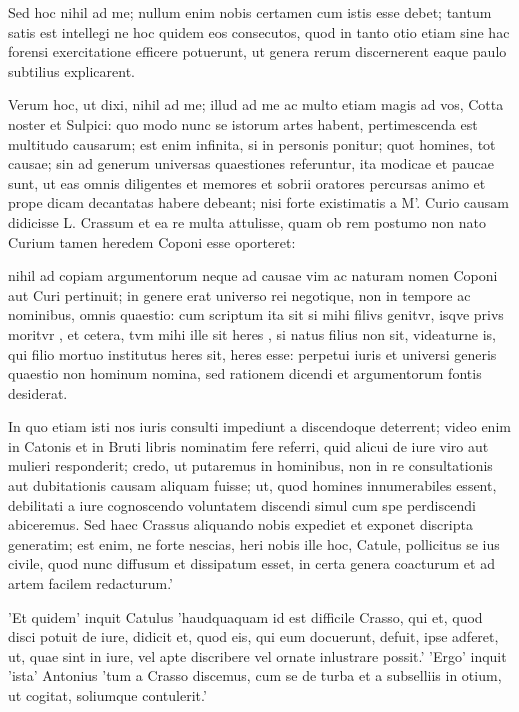  Sed hoc nihil ad me; nullum enim nobis certamen cum istis esse debet; tantum satis est intellegi ne hoc quidem eos consecutos, quod in tanto otio etiam sine hac forensi exercitatione efficere potuerunt, ut genera rerum discernerent eaque paulo subtilius explicarent.

 Verum hoc, ut dixi, nihil ad me; illud ad me ac multo etiam magis ad vos, Cotta noster et Sulpici: quo modo nunc se istorum artes habent, pertimescenda est multitudo causarum; est enim infinita, si in personis ponitur; quot homines, tot causae; sin ad generum universas quaestiones referuntur, ita modicae et paucae sunt, ut eas omnis diligentes et memores et sobrii oratores percursas animo et prope dicam decantatas habere debeant; nisi forte existimatis a M'. Curio causam didicisse L. Crassum et ea re multa attulisse, quam ob rem postumo non nato Curium tamen heredem Coponi esse oporteret:

 nihil ad copiam argumentorum neque ad causae vim ac naturam nomen Coponi aut Curi pertinuit; in genere erat universo rei negotique, non in tempore ac nominibus, omnis quaestio: cum scriptum ita sit si mihi filivs genitvr, isqve privs moritvr , et cetera, tvm mihi ille sit heres , si natus filius non sit, videaturne is, qui filio mortuo institutus heres sit, heres esse: perpetui iuris et universi generis quaestio non hominum nomina, sed rationem dicendi et argumentorum fontis desiderat.

 In quo etiam isti nos iuris consulti impediunt a discendoque deterrent; video enim in Catonis et in Bruti libris nominatim fere referri, quid alicui de iure viro aut mulieri responderit; credo, ut putaremus in hominibus, non in re consultationis aut dubitationis causam aliquam fuisse; ut, quod homines innumerabiles essent, debilitati a iure cognoscendo voluntatem discendi simul cum spe perdiscendi abiceremus. Sed haec Crassus aliquando nobis expediet et exponet discripta generatim; est enim, ne forte nescias, heri nobis ille hoc, Catule, pollicitus se ius civile, quod nunc diffusum et dissipatum esset, in certa genera coacturum et ad artem facilem redacturum.'

 'Et quidem' inquit Catulus 'haudquaquam id est difficile Crasso, qui et, quod disci potuit de iure, didicit et, quod eis, qui eum docuerunt, defuit, ipse adferet, ut, quae sint in iure, vel apte discribere vel ornate inlustrare possit.' 'Ergo' inquit 'ista' Antonius 'tum a Crasso discemus, cum se de turba et a subselliis in otium, ut cogitat, soliumque contulerit.'

